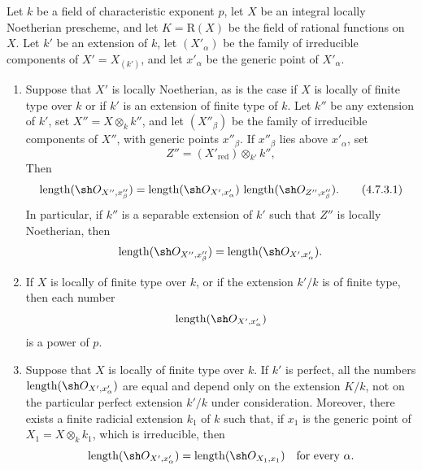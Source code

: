 \begin{proposition}[4.7.3]
\label{IV.4.7.3}
Let $k$ be a field of characteristic exponent $p$, let $X$ be an
integral locally Noetherian prescheme, and let
$K=\mathrm R(X)$ be the field of rational functions on $X$.
Let $k'$ be an extension of $k$, let $(X'_\alpha)$ be the family of
irreducible components of $X'=X_{(k')}$, and let $x'_\alpha$ be the
generic point of $X'_\alpha$.
\begin{enumerate}
\item[\rm(i)]
\label{IV.4.7.3.i}
Suppose that $X'$ is locally Noetherian, as is the case if $X$ is
locally of finite type over $k$ or if $k'$ is an extension of finite
type of $k$.
Let $k''$ be any extension of $k'$, set
$X''=X\otimes_k k''$, and let $(X''_\beta)$ be the family of
irreducible components of $X''$, with generic points $x''_\beta$.
If $x''_\beta$ lies above $x'_\alpha$, set
\[
 Z''=(X'_{\mathrm{red}})\otimes_{k'}k'',
\]
Then
\begin{equation}
\operatorname{length}(\sh O_{X'',x''_\beta})
=
\operatorname{length}(\sh O_{X',x'_\alpha})\,
\operatorname{length}(\sh O_{Z'',x''_\beta}).
\tag{4.7.3.1}
\label{IV.4.7.3.1}
\end{equation}
In particular, if $k''$ is a separable extension of $k'$ such that
$Z''$ is locally Noetherian, then
\[
\operatorname{length}(\sh O_{X'',x''_\beta})
=\operatorname{length}(\sh O_{X',x'_\alpha}).
\]

\item[\rm(ii)]
\label{IV.4.7.3.ii}
If $X$ is locally of finite type over $k$, or if the extension $k'/k$
is of finite type, then each number
\[
\operatorname{length}(\sh O_{X',x'_\alpha})
\]
is a power of $p$.

\item[\rm(iii)]
\label{IV.4.7.3.iii}
Suppose that $X$ is locally of finite type over $k$.
If $k'$ is perfect, all the numbers
$\operatorname{length}(\sh O_{X',x'_\alpha})$ are equal and depend
only on the extension $K/k$, not on the particular perfect extension
$k'/k$ under consideration.
Moreover, there exists a finite radicial extension $k_1$ of $k$ such
that, if $x_1$ is the generic point of
$X_1=X\otimes_k k_1$, which is irreducible, then
\[
\operatorname{length}(\sh O_{X',x'_\alpha})
=\operatorname{length}(\sh O_{X_1,x_1})
\quad\text{for every }\alpha.
\]
\end{enumerate}
\end{proposition}

